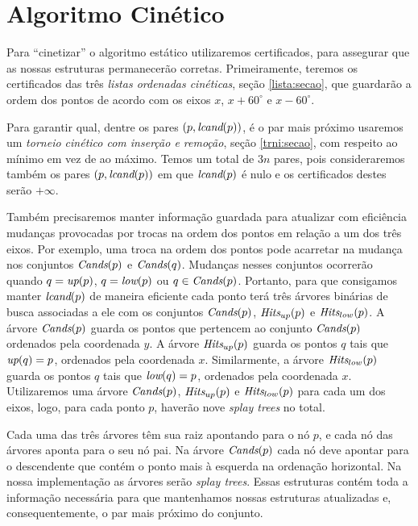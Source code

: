 
\FloatBarrier
\section{Algoritmo Cinético}

Para ``cinetizar'' o algoritmo estático utilizaremos certificados,
para assegurar que as nossas estruturas permanecerão corretas.
Primeiramente, teremos os certificados das três \textit{listas
ordenadas cinéticas}, seção \ref{lista:secao}, que guardarão a ordem
dos pontos de acordo com os eixos $x$, $x + 60^\circ$ e $x -
60^\circ$.

Para garantir qual, dentre os pares $(p, \textit{lcand}(p))$, é o par mais
próximo usaremos um \textit{torneio cinético com inserção e
remoção}, seção \ref{trni:secao}, com respeito ao mínimo em vez de
ao máximo. Temos um total de $3n$ pares, pois consideraremos também
os pares $(p, \textit{lcand}(p))$ em que $\textit{lcand}(p)$ é nulo e os
certificados destes serão $+\infty$.

Também precisaremos manter informação guardada para atualizar com
eficiência mudanças provocadas por trocas na ordem dos pontos em
relação a um dos três eixos. Por exemplo, uma troca na ordem dos
pontos pode acarretar na mudança nos conjuntos $\textit{Cands}(p)$ e
$\textit{Cands}(q)$. Mudanças nesses conjuntos ocorrerão quando $q =
\textit{up}(p)$, $q = \textit{low}(p)$ ou $q \in \textit{Cands}(p)$. Portanto, para que
consigamos manter $\textit{lcand}(p)$ de maneira eficiente cada ponto terá
três árvores binárias de busca associadas a ele com os conjuntos
$\textit{Cands}(p)$, $\textit{Hits}_{up}(p)$ e $\textit{Hits}_{low}(p)$. A árvore
$\textit{Cands}(p)$ guarda os pontos que pertencem ao conjunto $\textit{Cands}(p)$
ordenados pela coordenada $y$. A árvore $\textit{Hits}_{up}(p)$ guarda os
pontos $q$ tais que $\textit{up}(q) = p$, ordenados pela coordenada $x$.
Similarmente, a árvore $\textit{Hits}_{low}(p)$ guarda os pontos $q$ tais
que $\textit{low}(q) = p$, ordenados pela coordenada $x$. Utilizaremos uma
árvore $\textit{Cands}(p)$, $\textit{Hits}_{up}(p)$ e $\textit{Hits}_{low}(p)$ para cada um
dos eixos, logo, para cada ponto $p$, haverão nove \textit{splay
trees} no total.

Cada uma das três árvores têm sua raiz apontando para o nó $p$, e
cada nó das árvores aponta para o seu nó pai. Na árvore $\textit{Cands}(p)$
cada nó deve apontar para o descendente que contém o ponto mais à
esquerda na ordenação horizontal. Na nossa implementação as árvores
serão \textit{splay trees}. Essas estruturas contém toda a
informação necessária para que mantenhamos nossas estruturas
atualizadas e, consequentemente, o par mais próximo do conjunto.

